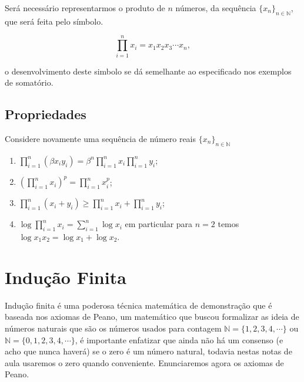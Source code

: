 Será necessário representarmos o produto de $n$ números, da sequência $\{x_n\}_{n\in \mathbb{N}}$, que será feita pelo símbolo.

\begin{equation}
    \prod_{i=1}^{n} x_i = x_1x_2x_3\cdots x_n,
\end{equation}

\noindent o desenvolvimento deste simbolo se dá semelhante ao especificado nos exemplos de somatório. 

\subsection{Propriedades}
Considere novamente uma sequência de número reais $\{x_n\}_{n\in \mathbb{N}}$
\begin{enumerate}
    \item [(i)] $\displaystyle \prod_{i=1}^{n} (\beta x_iy_i) = \displaystyle \beta^n \prod_{i=1}^{n} x_i \displaystyle \prod_{i=1}^{n} y_i $;
    \item[(ii)] $\displaystyle \left(\prod^n_{i = 1}  x_i\right)^p = \displaystyle \prod^n_{i = 1}  x_i^p$;
    \item [(iii)] $\displaystyle \prod^n_{i = 1}  (x_i + y_i) \geq \displaystyle \prod^n_{i = 1}  x_i + \displaystyle \prod^n_{i = 1}  y_i$; 
    \item[(iv)] $\displaystyle\log \prod^n_{i = 1}  x_i =  \sum^n_{i = 1}\log x_i$ em particular para $n=2$ temos $\log x_1x_2 = \log x_1 + \log x_2$.
\end{enumerate}

\section{Indução Finita}
\inic Indução finita é uma poderosa técnica matemática de demonstração que é baseada nos axiomas de Peano, um matemático que buscou formalizar as ideia de números naturais que são os números usados para contagem $\mathbb{N} = \{1,2,3,4,\cdots\}$ ou $\mathbb{N} = \{0,1,2,3,4,\cdots \}$, é importante enfatizar que ainda não há um consenso (e acho que nunca haverá) se o zero é um número natural, todavia nestas notas de aula usaremos o zero quando conveniente. Enunciaremos agora os axiomas de Peano.

